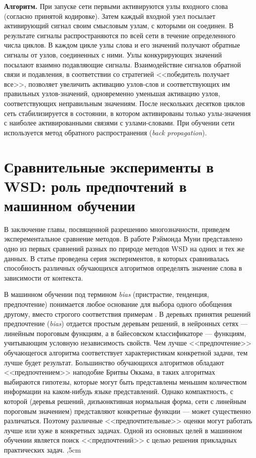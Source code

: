 \documentclass{article}
\begin{document}
\begin{articletext}
\textbf{Алгоритм.} При запуске сети первыми активируются узлы входного  слова  (согласно принятой кодировке). Затем  каждый  входной узел посылает активирующий сигнал своим смысловым узлам, с которыми он соединен. В результате  сигналы распространяются по всей сети в течение определенного числа циклов. В каждом цикле узлы слова и  его значений получают обратные сигналы от узлов, соединенных с ними. Узлы конкурирующих значений посылают взаимно подавляющие сигналы.  Взаимодействие  сигналов  обратной  связи  и  подавления,  в соответствии со стратегией <<победитель получает все>>, позволяет увеличить активацию узлов-слов и соответствующих им правильных узлов-значений,  одновременно  уменьшая  активацию  узлов,  соответствующих неправильным значениям. После нескольких десятков  циклов сеть стабилизируется  в  состоянии, в котором активированы  только узлы-значения с наиболее активированными связями  с    узлами-словами. При обучении сети  используется  метод  обратного  распространения (\textit{back  propagation}).    

\section{Сравнительные эксперименты в WSD: роль предпочтений в машинном обучении}

\begin{flushright}
\end{flushright}

В заключение главы, посвященной разрешению многозначности, приведем эксперементальное сравнение методов. В работе Рэймонда Муни \cite{Mooney 1996} представлено одно из первых сравнений разных по природе методов WSD на одних и тех же данных. В статье \cite{Mooney 1996} проведена серия экспериментов, в которых сравнивалась способность различных обучающихся алгоритмов определять значение слова в зависимости от контекста. 

В машинном обучении под термином \textit{bias} (пристрастие, тенденция, предпочтение)  понимается любое основание для выбора одного обобщения другому, вместо строгого соответствия примерам \cite{Mooney 1996}. В деревьях принятия решений предпочтение (\textit{bias}) отдается простым деревьям решений, в нейронных сетях --- линейным пороговым функциям, а в байесовском классификаторе --- функциям, учитывающим условную независимость свойств. Чем лучше <<предпочтение>> обучающегося алгоритма соответствует характеристикам конкретной задачи, тем лучше будет результат. Большинство обучающихся алгоритмов обладают <<предпочтением>> наподобие Бритвы Оккама, в таких алгоритмах выбираются гипотезы, которые могут быть представлены меньшим количеством информации на каком-нибудь языке представлений. Однако компактность, с которой (деревья решений, дизъюнктивная нормальная форма, сети с линейным пороговым значением) представляют конкретные функции --- может существенно различаться. Поэтому различные <<предпочтительные>> оценки могут работать лучше или хуже в конкретных задачах. Одной из основных целей в машинном обучении является поиск <<предпочтений>> с целью решения прикладных практических задач.
,5cm


\end{articletext}
\end{document}
